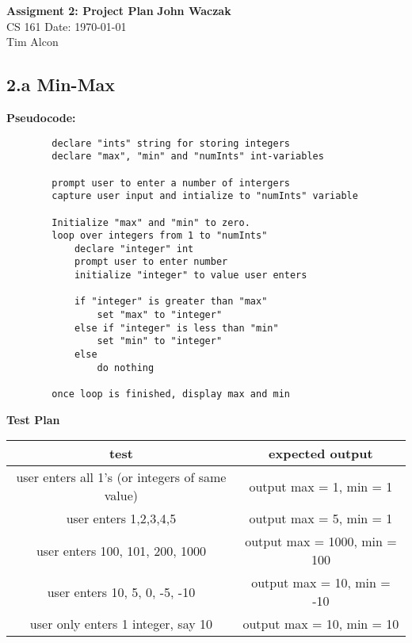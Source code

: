 \documentclass[a4paper, 11pt]{article}
\begin{document}
\noindent
\large\textbf{Assigment 2: Project Plan} \hfill \textbf{John Waczak} \\
\normalsize CS 161 \hfill  Date: \today \\
Tim Alcon \\

	
\subsection*{2.a Min-Max}
	\textbf{Pseudocode:} 
	\begin{lstlisting}
		declare "ints" string for storing integers 
		declare "max", "min" and "numInts" int-variables
		
		prompt user to enter a number of intergers
		capture user input and intialize to "numInts" variable 
		
		Initialize "max" and "min" to zero.
		loop over integers from 1 to "numInts" 
			declare "integer" int 
			prompt user to enter number
			initialize "integer" to value user enters
			
			if "integer" is greater than "max"			
				set "max" to "integer"
			else if "integer" is less than "min"
				set "min" to "integer" 
			else 
				do nothing 
		
		once loop is finished, display max and min		  	
	\end{lstlisting}
	
	\textbf{Test Plan}
		\begin{center}
			\begin{tabular}{|c|c|}
				\hline
				\textbf{test} & \textbf{expected output} \\ 
				\hline 
				user enters all 1's (or integers of same value) & output max = 1, min = 1\\
				\hline 
				user enters 1,2,3,4,5 & output max = 5, min = 1 \\ 
				\hline 
				user enters 100, 101, 200, 1000 & output max = 1000, min = 100 \\ 
				\hline 
				user enters 10, 5, 0, -5, -10 & output max = 10, min = -10 \\ 
				\hline 
				user only enters 1 integer, say 10 & output max = 10, min = 10 \\ 
				\hline 
			\end{tabular}
		\end{center}
	
\end{document}
